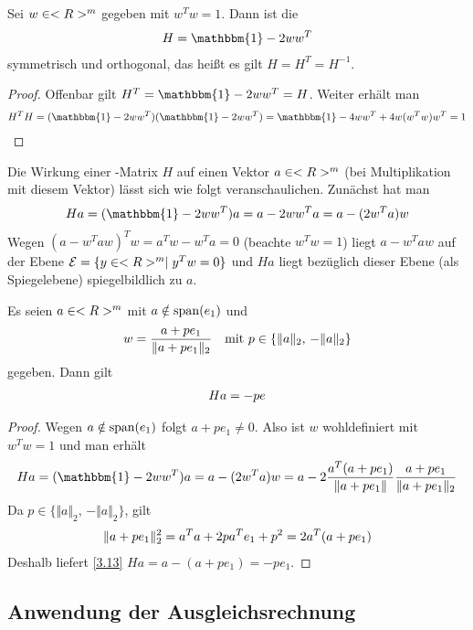 \begin{proposition}
	Sei $w\in<R>^m$ gegeben mit $w^Tw=1$. Dann ist die 
	\begin{align}
		H = \mathbbm{1} - 2ww^T\notag
	\end{align}
	symmetrisch und orthogonal, das heißt es gilt $H=H^T=H^{-1}$.
\end{proposition}
\begin{proof}
	Offenbar gilt $H^T=\mathbbm{1}-2ww^T=H$. Weiter erhält man
	\begin{align}
		H^TH=(\mathbbm{1}-2ww^T)(\mathbbm{1}-2ww^T) = \mathbbm{1} - 4ww^T + 4w(w^Tw)w^T = 1\notag
	\end{align}
\end{proof}

Die Wirkung einer -Matrix $H$ auf einen Vektor $a\in<R>^m$ (bei Multiplikation mit diesem Vektor) lässt sich wie folgt veranschaulichen. Zunächst hat man
\begin{align}
	Ha=(\mathbbm{1}-2ww^T)a = a-2ww^Ta = a-(2w^Ta)w\notag
\end{align}
Wegen $(a-w^Taw)^Tw=a^Tw-w^Ta=0$ (beachte $w^Tw=1$) liegt $a-w^Taw$ auf der Ebene $\mathcal{E}=\{y\in<R>^m\mid y^Tw=0\}$ und $Ha$ liegt bezüglich dieser Ebene (als Spiegelebene) spiegelbildlich zu $a$.

\begin{proposition}
	Es seien $a\in<R>^m$ mit $a\notin\operatorname{span}(e_1)$ und 
	\begin{align}
		w = \frac{a+pe_1}{\Vert a+pe_1\Vert_2}\quad\text{mit } p\in\{\Vert a\Vert_2,\, -\Vert a\Vert_2\}\notag
	\end{align}
	gegeben. Dann gilt
	\begin{align}
		Ha = -pe\notag
	\end{align}
\end{proposition}
\begin{proof}
	Wegen $a\notin\operatorname{span}(e_1)$ folgt $a+pe_1\neq 0$. Also ist $w$ wohldefiniert mit $w^Tw=1$ und man erhält
	\begin{align}
		\label{3.13}
		Ha = (\mathbbm{1}-2ww^T)a = a-(2w^Ta)w = a-2\frac{a^T(a+pe_1)}{\Vert a+pe_1\Vert}\frac{a+pe_1}{\Vert a+pe_1\Vert_2}
	\end{align}
	Da $p\in\{\Vert a\Vert_2,\, -\Vert a\Vert_2\}$, gilt
	\begin{align}
		\Vert a+pe_1\Vert_2^2 = a^Ta+2pa^Te_1+p^2 = 2a^T(a+pe_1)\notag
	\end{align}
	Deshalb liefert \cref{3.13} $Ha = a-(a+pe_1) = -pe_1$.
\end{proof}


\subsection{Anwendung der Ausgleichsrechnung}